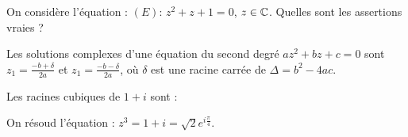 \begin{question}

On considère l'équation : $(E) : \, z^2+z+1=0$, $z\in \mathbb{C}$.   Quelles sont les assertions vraies ?
\begin{answers}
    


\end{answers}
\begin{explanations}
Les solutions complexes d'une équation du second degré $az^2+bz+c=0$ sont $z_1=\frac{-b+\delta}{2a}$ et  
$z_1=\frac{-b-\delta}{2a}$, où $\delta$ est une racine carrée de $\Delta=b^2-4ac$.
\end{explanations}

\end{question}




\begin{question}
 
Les racines cubiques de $1+i$ sont : 
\begin{answers}


\end{answers}
\begin{explanations}
On résoud l'équation  : $z^3=1+i= \sqrt 2e^{i\frac{\pi}{4}}$.

\end{explanations}

\end{question}





